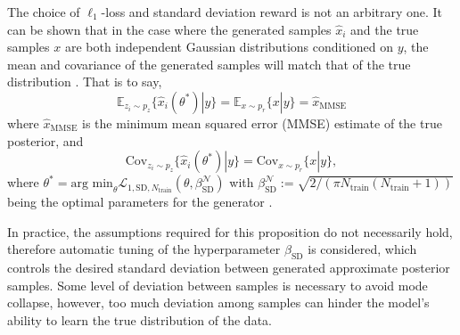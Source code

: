 \documentclass[fleqn,usenatbib]{mnras}
\newcommand{\Lagr}{\mathcal{L}}
\begin{document}
The choice of $\ell_1$-loss and standard deviation reward is not an arbitrary one. It can be shown that in the case where the generated samples $\hat{x}_i$ and the true samples $x$ are both independent Gaussian distributions conditioned on $y$, the mean and covariance of the generated samples will match that of the true distribution \citep[\S Prop. 3.1]{bendel2024regularized}. That is to say,
\begin{equation}\label{eq:prop_3.1_expectation}
	\mathbb{E}_{z_i \sim p_z} \{ \hat{x}_i (\theta^*) | y\} = \mathbb{E}_{x \sim p_r} \{ x | y\} = \hat{x}_{\text{MMSE}}
\end{equation}
where $\hat{x}_{\text{MMSE}}$ is the minimum mean squared error (MMSE) estimate of the true posterior, and
\begin{equation}\label{eq:prop_3.1_covariance}
	\text{Cov}_{z_i \sim p_z} \{ \hat{x}_i (\theta^*) | y\} = \text{Cov}_{x \sim p_r} \{ x | y\},
\end{equation}
where $\theta^* = \text{arg min}_\theta \Lagr_{1, \text{SD}, N_\text{train}}(\theta, \beta_\text{SD}^\mathcal{N})$ with $\beta_\text{SD}^\mathcal{N} := \sqrt{2 / (\pi N_\text{train}(N_\text{train}+1))}$ being the optimal parameters for the generator \citep{bendel2024regularized}.

In practice, the assumptions required for this proposition do not necessarily hold, therefore automatic tuning of the hyperparameter $\beta_{\text{SD}}$ is considered, which controls the desired standard deviation between generated approximate posterior samples. Some level of deviation between samples is necessary to avoid mode collapse, however, too much deviation among samples can hinder the model's ability to learn the true distribution of the data.
\end{document}

